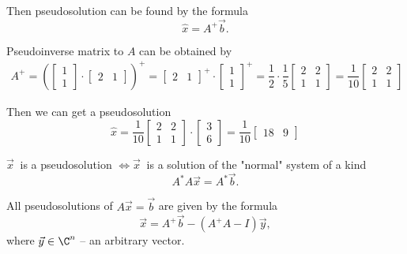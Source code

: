     Then pseudosolution can be found by the formula
    \[
        \hat{x} = A^+\vec{b}.  
    \]
    
    Pseudoinverse matrix to $A$ can be obtained by
    \begin{gather*}
        A^+ = \left( \begin{bmatrix}
            1 \\ 1
        \end{bmatrix} \cdot \begin{bmatrix}
            2 & 1
        \end{bmatrix}\right)^+ = \begin{bmatrix}
            2 & 1
        \end{bmatrix}^+ \cdot \begin{bmatrix}
            1 \\ 1
        \end{bmatrix}^+ = \dfrac{1}{2}\cdot\dfrac{1}{5} \begin{bmatrix}
            2 & 2 \\
            1 & 1
        \end{bmatrix} = \dfrac{1}{10} \begin{bmatrix}
            2 & 2 \\
            1 & 1
        \end{bmatrix}
    \end{gather*}
    
    Then we can get a pseudosolution
    \[
        \hat{x} = \dfrac{1}{10} \begin{bmatrix}
            2 & 2 \\
            1 & 1
        \end{bmatrix} \cdot \begin{bmatrix}
            3 \\ 
            6
        \end{bmatrix} = \dfrac{1}{10} \begin{bmatrix}
            18 & 9
        \end{bmatrix}
    \]
    \begin{proposition}{}{}
        $\vec{x}\ $ is a pseudosolution $\Leftrightarrow \vec{x}\ $ is a solution of the "normal" system of a kind
        \[
            A^*A\vec{x} = A^*\vec{b}.  
        \]
    \end{proposition}
    
    \begin{proposition}{}{}
        All pseudosolutions of $A\vec{x} = \vec{b}$ are given by the formula
        \[
            \vec{x} = A^+\vec{b} - (A^+A-I)\vec{y},  
        \]
        where $\vec{y} \in \C^n$ -- an arbitrary vector.
    \end{proposition}
    

